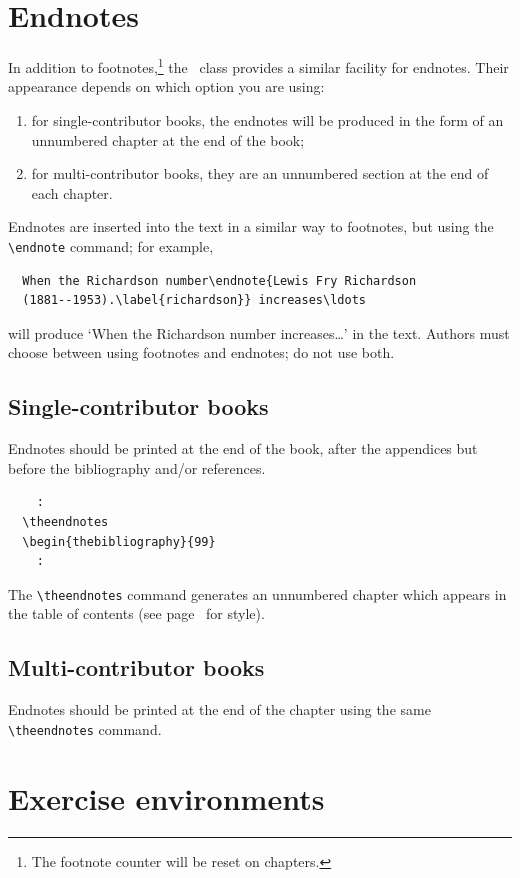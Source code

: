 \section{Endnotes}

In addition to footnotes,\footnote{The footnote counter will be reset on chapters.} the \cambridge\ class provides a similar facility for endnotes. Their appearance depends on which option you are using:
\begin{enumerate}
\item for single-contributor books, the endnotes will be produced in the form of an unnumbered chapter at the end of the book;
\item for multi-contributor books, they are an unnumbered section at the end of each chapter.
\end{enumerate}
Endnotes are inserted into the text in a similar way to footnotes, but using the \verb"\endnote" command; for example,
\begin{verbatim}
  When the Richardson number\endnote{Lewis Fry Richardson
  (1881--1953).\label{richardson}} increases\ldots
\end{verbatim}
will produce `When the Richardson number increases\ldots' in the text. Authors must choose between using footnotes and endnotes; do not use both.

\subsection{Single-contributor books}
Endnotes should be printed at the end of the book, after the appendices but before the bibliography and/or references.
\begin{verbatim}
    :
  \theendnotes
  \begin{thebibliography}{99}
    :
\end{verbatim}
The \verb"\theendnotes" command generates an unnumbered chapter which appears in the table of contents (see page~\pageref{richardson} for style).

\subsection{Multi-contributor books}

Endnotes should be printed at the end of the chapter using the same \verb"\theendnotes" command.

\section{Exercise environments}

